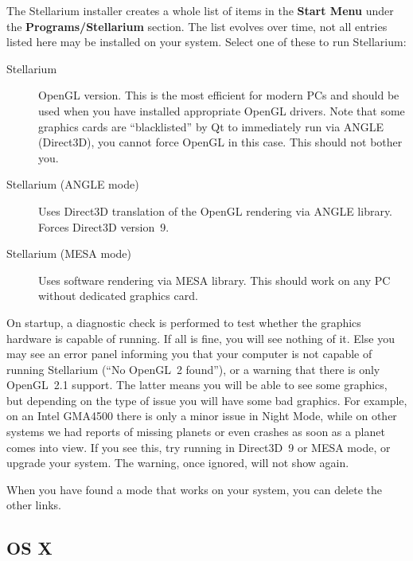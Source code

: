 The Stellarium installer creates a whole list of items in the
\textbf{Start Menu} under the \textbf{Programs/Stellarium}
section. The list evolves over time, not all entries listed here 
may be installed on your system. Select one of these to run Stellarium:
\begin{description}
\item[Stellarium] OpenGL version. This is the most efficient for
  modern PCs and should be used when you have installed appropriate
  OpenGL drivers. Note that some graphics cards are ``blacklisted'' by
  Qt to immediately run via ANGLE (Direct3D), you cannot force OpenGL in this
  case. This should not bother you.
\item[Stellarium (ANGLE mode)] Uses Direct3D translation of the OpenGL
  rendering via ANGLE library.  Forces Direct3D version~9.
\item[Stellarium (MESA mode)] Uses software rendering via MESA
  library. This should work on any PC without dedicated graphics card.
\end{description}
On startup, a diagnostic check is performed to test whether the
graphics hardware is capable of running. If all is fine, you will see
nothing of it.  Else you may see an error panel informing you that
your computer is not capable of running Stellarium (``No OpenGL~2
found''), or a warning that there is only OpenGL~2.1 support. The
latter means you will be able to see some graphics, but depending on
the type of issue you will have some bad graphics. For example, on an
Intel GMA4500 there is only a minor issue in Night Mode, while on
other systems we had reports of missing planets or even crashes as
soon as a planet comes into view. If you see this, try running in
Direct3D~9 or MESA mode, or upgrade your system. The warning, once
ignored, will not show again.

When you have found a mode that works on your system, you can delete
the other links.

\subsection{OS X}
\label{sec:GettingStarted:Running:MacOSX}

